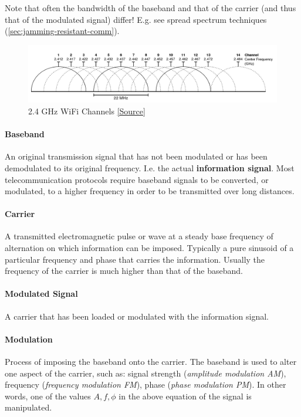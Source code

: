Note that often the bandwidth of the baseband and that of the carrier (and thus that of the modulated signal) differ!
E.g. see spread spectrum techniques (\autoref{sec:jamming-resistant-comm}).

\begin{figure}
	\centering
	\includegraphics[scale=0.35]{images/1-wifi-channels.png}
	\caption{2.4 GHz WiFi Channels \href{https://en.wikipedia.org/wiki/List\_of\_WLAN\_channels\#/media/File:2.4\_GHz\_Wi-Fi\_channels\_(802.11b,g_WLAN).svg}{[Source]}}
	\label{fig:wifi-channels}
\end{figure}

\paragraph{Baseband}
An original transmission signal that has not been modulated or has been demodulated to its original frequency.
I.e. the actual \textbf{information signal}.
Most telecommunication protocols require baseband signals to be converted, or modulated, to a higher frequency in order to be transmitted over long distances.

\paragraph{Carrier}
A transmitted electromagnetic pulse or wave at a steady base frequency of alternation on which information can be imposed.
Typically a pure sinusoid of a particular frequency and phase that carries the information.
Usually the frequency of the carrier is much higher than that of the baseband.

\paragraph{Modulated Signal}
A carrier that has been loaded or modulated with the information signal.

\paragraph{Modulation}
Process of imposing the baseband onto the carrier.
The baseband is used to alter one aspect of the carrier, such as:
signal strength (\textit{amplitude modulation AM}), frequency (\textit{frequency modulation FM}), phase (\textit{phase modulation PM}).
In other words, one of the values $A, f, \phi$ in the above equation of the signal is manipulated.

